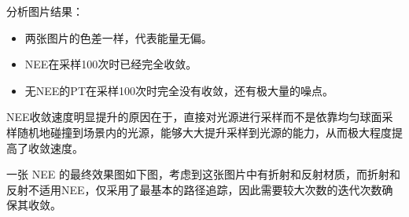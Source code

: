 \documentclass[UTF8]{ctexart}
\begin{document}
    分析图片结果：

    \begin{itemize}
        \item 两张图片的色差一样，代表能量无偏。
        \item NEE在采样100次时已经完全收敛。
        \item 无NEE的PT在采样100次时完全没有收敛，还有极大量的噪点。
    \end{itemize}

    NEE收敛速度明显提升的原因在于，直接对光源进行采样而不是依靠均匀球面采样随机地碰撞到场景内的光源，能够大大提升采样到光源的能力，从而极大程度提高了收敛速度。

    一张 NEE 的最终效果图如下图，考虑到这张图片中有折射和反射材质，而折射和反射不适用NEE，仅采用了最基本的路径追踪，因此需要较大次数的迭代次数确保其收敛。
\end{document}
